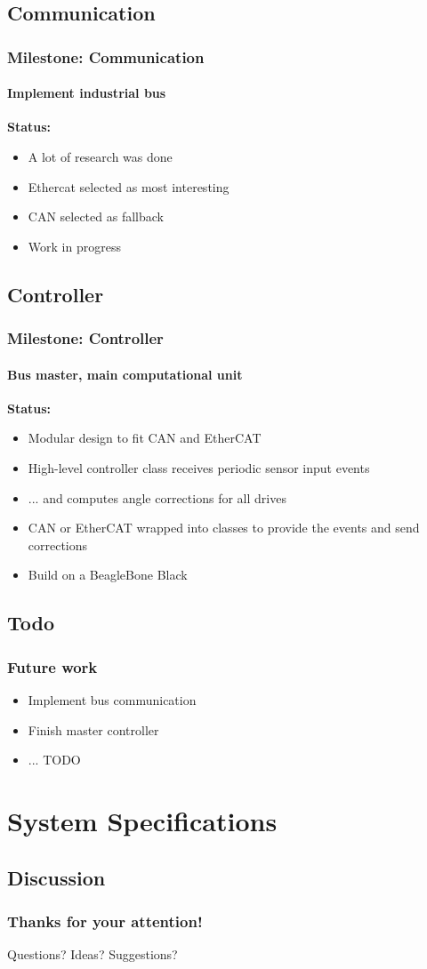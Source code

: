 \documentclass{beamer}
\begin{document}
\subsection{Communication}
\begin{frame}
  \frametitle{Milestone: Communication}
  \framesubtitle{Implement industrial bus}
  \textbf{Status:}
	\begin{itemize}
		\item A lot of research was done
		\item Ethercat selected as most interesting
		\item CAN selected as fallback
		\item Work in progress
	\end{itemize}
\end{frame}

\subsection{Controller}
\begin{frame}
  \frametitle{Milestone: Controller}
  \framesubtitle{Bus master, main computational unit}
  \textbf{Status:}
	\begin{itemize}
		\item Modular design to fit CAN and EtherCAT
		\item High-level controller class receives periodic sensor input events
		\item ... and computes angle corrections for all drives
		\item CAN or EtherCAT wrapped into classes to provide the events and send corrections
		\item Build on a BeagleBone Black
	\end{itemize}
\end{frame}

\subsection{Todo}
\begin{frame}
  \frametitle{Future work}
  	\begin{itemize}
		\item Implement bus communication
		\item Finish master controller
		\item ... TODO
	\end{itemize}
\end{frame}

\section{System Specifications}

\subsection{Discussion}
\begin{frame}
	\frametitle{Thanks for your attention!}
	\huge{Questions? Ideas? Suggestions?}
\end{frame}
\end{document}
